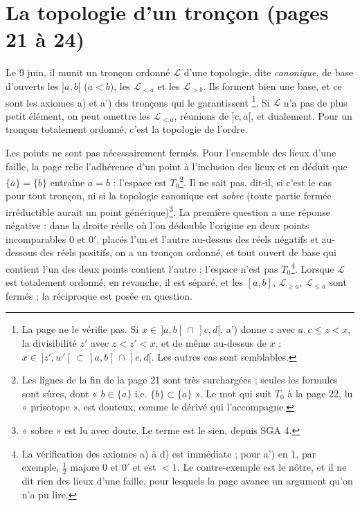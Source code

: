 \documentclass[11pt,a4paper]{article}
\begin{document}
\section*{La topologie d'un tronçon (pages 21 à 24)}

Le 9 juin, il munit un tronçon ordonné $\mathcal{L}$ d'une topologie, dite
\emph{canonique}, de base d'ouverts les $]a,b[$ ($a < b$), les
$\mathcal{L}_{<a}$ et les $\mathcal{L}_{>b}$. Ils forment bien une base, et ce
sont les axiomes a) et a') des tronçons qui le garantissent
\footnote{La page ne le vérifie pas. Si $x \in \,]a,b[\, \cap
\,]c,d[$, a') donne $z$ avec $a, c \leq z < x$, la divisibilité $z'$ avec $z <
z' < x$, et de même au-dessus de $x$ : $x \in \,]z', w'[\, \subset \,]a,b[\,
\cap \,]c,d[$. Les autres cas sont semblables.}. Si $\mathcal{L}$ n'a pas de
plus petit élément, on peut omettre les $\mathcal{L}_{<a}$, réunions de
$]c,a[$, et dualement. Pour un tronçon totalement ordonné, c'est la topologie de
l'ordre.

Les points ne sont pas nécessairement fermés. Pour l'ensemble des lieux d'une
faille, la page relie l'adhérence d'un point à l'inclusion des lieux et en
déduit que $\overline{\{a\}} = \overline{\{b\}}$ entraîne $a = b$ : l'espace est
$T_{0}$\footnote{Les lignes de la fin de la page 21 sont très surchargées ;
seules les formules sont sûres, dont « $b \in \overline{\{a\}}$ i.e.
$\overline{\{b\}} \subset \overline{\{a\}}$ ». Le mot qui suit $T_{0}$ à la page
22, lu « prisotope », est douteux, comme le dérivé qui l'accompagne.}. Il ne
sait pas, dit-il, si c'est le cas pour tout tronçon, ni si la topologie canonique
est \emph{sobre} (toute partie fermée irréductible aurait un point
générique)\footnote{« sobre » est lu avec doute. Le terme est le sien, depuis SGA
4.}. La première question a une réponse négative : dans la droite réelle où
l'on dédouble l'origine en deux points incomparables $0$ et $0'$, placés l'un
et l'autre au-dessus des réels négatifs et au-dessous des réels positifs, on a
un tronçon ordonné, et tout ouvert de base qui contient l'un des deux points
contient l'autre ; l'espace n'est pas $T_{0}$\footnote{La vérification des
axiomes a) à d) est immédiate ; pour a') en $1$, par exemple, $\frac{1}{2}$
majore $0$ et $0'$ et est $< 1$. Le contre-exemple est le nôtre, et il ne dit
rien des lieux d'une faille, pour lesquels la page avance un argument qu'on n'a
pu lire.}. Lorsque $\mathcal{L}$ est totalement ordonné, en revanche, il est
séparé, et les $[a,b]$, $\mathcal{L}_{\geq a}$, $\mathcal{L}_{\leq a}$ sont
fermés ; la réciproque est posée en question.
\end{document}
